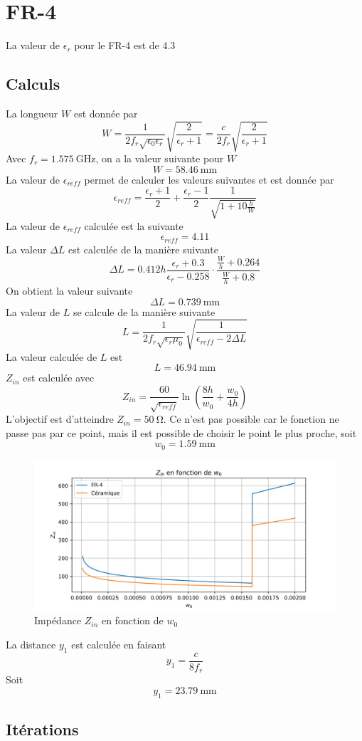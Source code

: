 \documentclass[Deriaz_Traiber_Labo02.tex]{subfiles}
\begin{document}
\section{FR-4}
La valeur de $\epsilon_r$ pour le FR-4 est de 4.3
\subsection{Calculs}
La longueur $W$ est donnée par
$$W=\frac{1}{2f_r\sqrt{\epsilon_0\epsilon_r}}\sqrt{\frac{2}{\epsilon_r+1}}=\frac{c}{2f_r}\sqrt{\frac{2}{\epsilon_r+1}}$$
Avec $f_r=\SI{1.575}{\giga\hertz}$, on a la valeur suivante pour $W$
$$W=\SI{58.46}{\milli\meter}$$
La valeur de $\epsilon_{reff}$ permet de calculer les valeurs suivantes et est donnée par
$$\epsilon_{reff}=\frac{\epsilon_r+1}{2}+\frac{\epsilon_r-1}{2}\frac{1}{\sqrt{1+10\frac{h}{W}}}$$
La valeur de $\epsilon_{reff}$ calculée est la suivante
$$\epsilon_{reff}=4.11$$
La valeur $\Delta L$ est calculée de la manière suivante
$$\Delta L=0.412h\frac{\epsilon_r+0.3}{\epsilon_r-0.258}\cdot\frac{\frac{W}{h}+0.264}{\frac{W}{h}+0.8}$$
On obtient la valeur suivante
$$\Delta L=\SI{0.739}{\milli\meter}$$
La valeur de $L$ se calcule de la manière suivante
$$L=\frac{1}{2f_r\sqrt{\epsilon_r\mu_0}}\sqrt{\frac{1}{\epsilon_{reff}-2\Delta L}}$$
La valeur calculée de $L$ est
$$L=\SI{46.94}{\milli\meter}$$
$Z_{in}$ est calculée avec
$$Z_{in}=\frac{60}{\sqrt{\epsilon_{reff}}}\ln\left(\frac{8h}{w_0}+\frac{w_0}{4h}\right)$$
L'objectif est d'atteindre $Z_{in}=\SI{50}{\ohm}$. Ce n'est pas possible car le fonction ne passe pas par ce point, mais il est possible de choisir le point le plus proche, soit
$$w_0=\SI{1.59}{\milli\meter}$$
\begin{figure}[H]
\centering
\includegraphics[width=12cm]{../Calculs/w0.png}
\caption{Impédance $Z_{in}$ en fonction de $w_0$}
\end{figure}
La distance $y_1$ est calculée en faisant
$$y_1=\frac{c}{8f_r}$$
Soit
$$y_1=\SI{23.79}{\milli\meter}$$
\subsection{Itérations}
\end{document}
